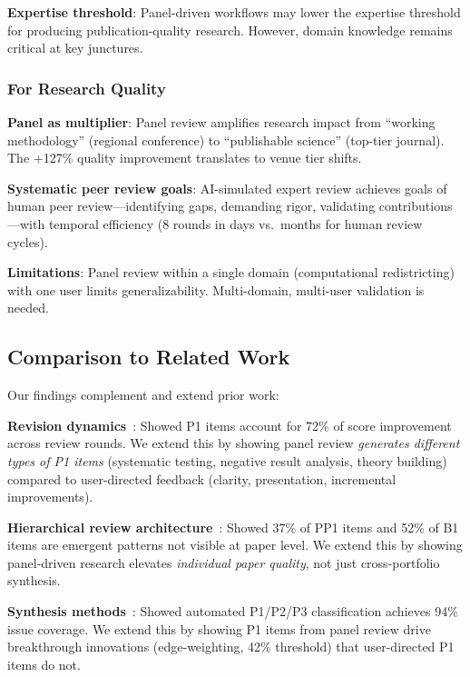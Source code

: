 \textbf{Expertise threshold}: Panel-driven workflows may lower the expertise threshold for producing publication-quality research. However, domain knowledge remains critical at key junctures.

\subsubsection{For Research Quality}

\textbf{Panel as multiplier}: Panel review amplifies research impact from ``working methodology'' (regional conference) to ``publishable science'' (top-tier journal). The +127\% quality improvement translates to venue tier shifts.

\textbf{Systematic peer review goals}: AI-simulated expert review achieves goals of human peer review---identifying gaps, demanding rigor, validating contributions---with temporal efficiency (8 rounds in days vs.\ months for human review cycles).

\textbf{Limitations}: Panel review within a single domain (computational redistricting) with one user limits generalizability. Multi-domain, multi-user validation is needed.

\subsection{Comparison to Related Work}

Our findings complement and extend prior work:

\textbf{Revision dynamics}~\cite{dellalibera2026revision}: Showed P1 items account for 72\% of score improvement across review rounds. We extend this by showing panel review \emph{generates different types of P1 items} (systematic testing, negative result analysis, theory building) compared to user-directed feedback (clarity, presentation, incremental improvements).

\textbf{Hierarchical review architecture}~\cite{dellalibera2026hierarchical}: Showed 37\% of PP1 items and 52\% of B1 items are emergent patterns not visible at paper level. We extend this by showing panel-driven research elevates \emph{individual paper quality}, not just cross-portfolio synthesis.

\textbf{Synthesis methods}~\cite{dellalibera2026synthesis}: Showed automated P1/P2/P3 classification achieves 94\% issue coverage. We extend this by showing P1 items from panel review drive breakthrough innovations (edge-weighting, 42\% threshold) that user-directed P1 items do not.

